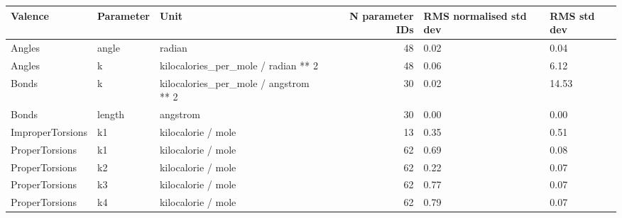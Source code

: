 \begin{tabular}{lllrll}
\toprule
Valence & Parameter & Unit & N parameter IDs & RMS normalised std dev & RMS std dev \\
\midrule
Angles & angle & radian & 48 & 0.02 & 0.04 \\
Angles & k & kilocalories_per_mole / radian ** 2 & 48 & 0.06 & 6.12 \\
Bonds & k & kilocalories_per_mole / angstrom ** 2 & 30 & 0.02 & 14.53 \\
Bonds & length & angstrom & 30 & 0.00 & 0.00 \\
ImproperTorsions & k1 & kilocalorie / mole & 13 & 0.35 & 0.51 \\
ProperTorsions & k1 & kilocalorie / mole & 62 & 0.69 & 0.08 \\
ProperTorsions & k2 & kilocalorie / mole & 62 & 0.22 & 0.07 \\
ProperTorsions & k3 & kilocalorie / mole & 62 & 0.77 & 0.07 \\
ProperTorsions & k4 & kilocalorie / mole & 62 & 0.79 & 0.07 \\
\bottomrule
\end{tabular}
